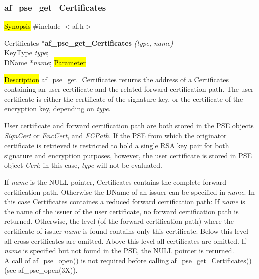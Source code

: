 \subsubsection{af\_pse\_get\_Certificates}
\label{af_get_Certificates}
\hl{Synopsis}
\#include $<$af.h$>$ 

Certificates *{\bf af\_pse\_get\_Certificates} {\em (type, name)} \\
KeyType {\em type}; \\
DName *{\em name};
\hl{Parameter}


\hl{Description}
af\_pse\_get\_Certificates returns the address of a Certificates containing an user certificate and the 
related forward 
certification path. The user certificate is either the certificate of the signature key,
or the certificate of the encryption key, depending on {\em type}.

User certificate and forward certification path are both stored
in the PSE objects {\em SignCert} or {\em EncCert}, and {\em FCPath}. If the PSE from which the originator certificate 
is retrieved is restricted to hold a single RSA key pair
for both signature and encryption purposes, however, the user certificate is stored in PSE object {\em Cert}; in this case, 
{\em type} will not be evaluated.

If {\em name} is the NULL pointer, Certificates contains the complete forward certification path. Otherwise
the DName of an issuer can be specified in {\em name}. In this case Certificates containes a reduced forward 
certification path:
\be
\m If {\em name} is the name of the issuer of the user certificate, no forward certification path
   is returned. 
\m Otherwise, the level (of the forward certification path) where the certificate of issuer {\em name} is found
   contains only this certificate.
\m Below this level all cross certificates are omitted.
\m Above this level all certificates are omitted.
\ee
If {\em name} is specified but not found in the PSE, the NULL pointer is returned.
\\ [1em]
A call of af\_pse\_open() is not required before calling af\_pse\_get\_Certificates()
(see af\_pse\_open(3X)).


